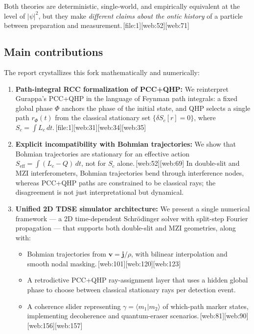 \documentclass[11pt]{article}
\begin{document}
Both theories are deterministic, single-world, and empirically equivalent at the level of \(|\psi|^2\), but they make \emph{different claims about the ontic history} of a particle between preparation and measurement.\,[file:1][web:52][web:71]

\subsection{Main contributions}

The report crystallizes this fork mathematically and numerically:

\begin{enumerate}[leftmargin=*]
  \item \textbf{Path-integral RCC formalization of PCC+QHP:} We reinterpret Gurappa's PCC+QHP in the language of Feynman path integrals: a fixed global phase \(\Phi\) anchors the phase of the initial state, and QHP selects a single path \(r_\Phi(t)\) from the classical stationary set \(\{\delta S_c [r] = 0\}\), where \(S_c=\int L_c\,dt\).\,[file:1][web:31][web:34][web:35]

  \item \textbf{Explicit incompatibility with Bohmian trajectories:} We show that Bohmian trajectories are stationary for an effective action \(S_{\text{eff}}=\int(L_c-Q)\,dt\), not for \(S_c\) alone.\,[web:52][web:69]
  In double-slit and MZI interferometers, Bohmian trajectories bend through interference nodes, whereas PCC+QHP paths are constrained to be classical rays; the disagreement is not just interpretational but dynamical.

  \item \textbf{Unified 2D TDSE simulator architecture:} We present a single numerical framework --- a 2D time-dependent Schr\"odinger solver with split-step Fourier propagation --- that supports both double-slit and MZI geometries, along with:
  \begin{itemize}
    \item Bohmian trajectories from \(\mathbf v=\mathbf j/\rho\), with bilinear interpolation and smooth nodal masking.\,[web:101][web:120][web:123]
    \item A retrodictive PCC+QHP ray-assignment layer that uses a hidden global phase to choose between classical stationary rays per detection event.
    \item A coherence slider representing \(\gamma = \langle m_1|m_2\rangle\) of which-path marker states, implementing decoherence and quantum-eraser scenarios.\,[web:81][web:90][web:156][web:157]
  \end{itemize}


\end{enumerate}
\end{document}
